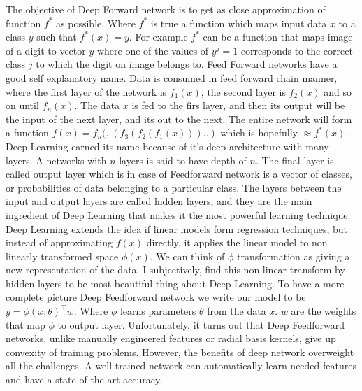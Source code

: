 \documentclass[paper=a4, fontsize=11pt]{scrartcl}
\numberwithin{equation}{section}		%
\numberwithin{figure}{section}			%
\numberwithin{table}{section}			%
\begin{document}
	\par 
		The objective of Deep Forward network is to get as close approximation of function $f^*$ as possible. Where $f^*$ is true a function which maps input data $x$ to a class $y$ such that $ f^*(x) = y $. For example $f^*$ can be a function that maps image of a digit to vector $y$ where one of the values of $y^j = 1$ corresponds to the correct class $j$ to which the digit on image belongs to.
	Feed Forward networks have a good self explanatory name. Data is consumed in feed forward chain manner, where the first layer of the network is $f_1(x)$, the second layer is $f_2(x)$ and so on until $f_n(x)$. The data $x$ is fed to the firs layer, and then its output will be the input of the next layer, and its out to the next. The entire network will form a function $f(x) = f_n(..(f_3(f_2(f_1(x)))..) $ which is hopefully $\approx f^*(x)$. Deep Learning earned its name because of it's deep architecture with many layers. A networks with $n$ layers is said to have depth of $n$. The final layer is called output layer which is in case of Feedforward network is a vector of classes, or probabilities of data belonging to a particular class. The layers between the input and output layers are called hidden layers, and they are the main ingredient of Deep Learning that makes it the most powerful learning technique. Deep Learning extends the idea if linear models form regression techniques, but instead of approximating $f(x)$ directly, it applies the linear model to non linearly transformed space $\phi(x)$. We can think of $\phi$ transformation as giving a new representation of the data. I subjectively, find this non linear transform by hidden layers to be most beautiful thing about Deep Learning. To have a more complete picture Deep Feedforward network we write our model to be $y = \phi(x;\theta)^\top w $. Where $\phi$ learns parameters $\theta$ from the data $x$. $w$ are the weights that map $\phi$ to output layer.
	Unfortunately, it turns out that Deep Feedforward networks, unlike manually engineered features or radial basis kernels, give up convexity of training problems. However, the benefits of deep network overweight all the challenges. A well trained network can automatically learn needed features and have a state of the art accuracy.
	
	
\end{document}
